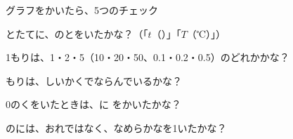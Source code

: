 \begin{column}{グラフをかいたら、5つのチェック}
\begin{enumerate}[label={\bkcircled[bkNavy]{\arabic*}}, leftmargin=2.4\zw, itemsep=1pt, topsep=1pt]
\item {}とたてに、のとをいたかな？（「$t$（）」「$T$（℃）」）
\item 1もりは、1・2・5（10・20・50、0.1・0.2・0.5）のどれかかな？
\item {}もりは、しいかくでならんでいるかな？
\item 0のくをいたときは、に \bkthrenami をかいたかな？
\item {}のには、おれではなく、なめらかなを1いたかな？
\end{enumerate}
\end{column}



